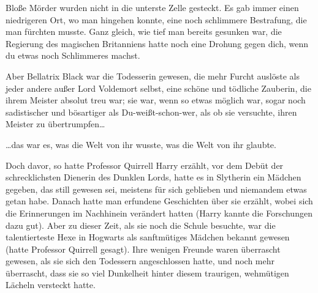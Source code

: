 Bloße Mörder wurden nicht in die unterste Zelle gesteckt. Es gab immer einen niedrigeren Ort, wo man hingehen konnte, eine noch schlimmere Bestrafung, die man fürchten musste. Ganz gleich, wie tief man bereits gesunken war, die Regierung des magischen Britanniens hatte noch eine Drohung gegen dich, wenn du etwas noch Schlimmeres machst.

Aber Bellatrix Black war die Todesserin gewesen, die mehr Furcht auslöste als jeder andere außer Lord Voldemort selbst, eine schöne und tödliche Zauberin, die ihrem Meister absolut treu war; sie war, wenn so etwas möglich war, sogar noch sadistischer und bösartiger als Du-weißt-schon-wer, als ob sie versuchte, ihren Meister zu übertrumpfen…

…das war es, was die Welt von ihr wusste, was die Welt von ihr glaubte.

Doch davor, so hatte Professor Quirrell Harry erzählt, vor dem Debüt der schrecklichsten Dienerin des Dunklen Lords, hatte es in Slytherin ein Mädchen gegeben, das still gewesen sei, meistens für sich geblieben und niemandem etwas getan habe. Danach hatte man erfundene Geschichten über sie erzählt, wobei sich die Erinnerungen im Nachhinein verändert hatten (Harry kannte die Forschungen dazu gut). Aber zu dieser Zeit, als sie noch die Schule besuchte, war die talentierteste Hexe in Hogwarts als sanftmütiges Mädchen bekannt gewesen (hatte Professor Quirrell gesagt). Ihre wenigen Freunde waren überrascht gewesen, als sie sich den Todessern angeschlossen hatte, und noch mehr überrascht, dass sie so viel Dunkelheit hinter diesem traurigen, wehmütigen Lächeln versteckt hatte.

